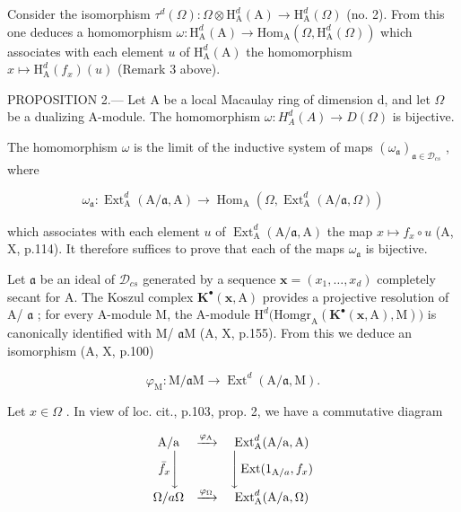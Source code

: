 Consider the isomorphism \(\tau^{d}(\Omega):\Omega\otimes\mathrm{H}_{\mathrm{A}}^{d}(\mathrm{A})\to\mathrm{H}_{\mathrm{A}}^{d}(\Omega)\) (no. 2). From this one deduces a homomorphism \(\omega:\mathrm{H}_{\mathrm{A}}^{d}(\mathrm{A})\to\mathrm{Hom}_{\mathrm{A}}(\Omega,\mathrm{H}_{\mathrm{A}}^{d}(\Omega))\) which associates with each element \(u\) of \(\mathrm{H}_{\mathrm{A}}^{d}(\mathrm{A})\) the homomorphism \(x\mapsto\mathrm{H}_{\mathrm{A}}^{d}(f_{x})(u)\) (Remark 3 above).

PROPOSITION 2.--- Let A be a local Macaulay ring of dimension d, and let \(\Omega\) be a dualizing A-module. The homomorphism \(\omega: H_{A}^{d}(A) \to D(\Omega)\) is bijective.

The homomorphism \(\omega\) is the limit of the inductive system of maps \((\omega_{\mathfrak{a}})_{\mathfrak{a}\in\mathcal{D}_{cs}}\) , where

\[
\omega_ {\mathfrak {a}}: \operatorname{Ext} _ {\mathrm{A}} ^ {d} (\mathrm{A} / \mathfrak {a}, \mathrm{A}) \longrightarrow \operatorname{Hom} _ {\mathrm{A}} (\Omega , \operatorname{Ext} _ {\mathrm{A}} ^ {d} (\mathrm{A} / \mathfrak {a}, \Omega))
\]

which associates with each element \(u\) of \(\operatorname{Ext}_{\mathrm{A}}^{d}(\mathrm{A}/\mathfrak{a},\mathrm{A})\) the map \(x\mapsto f_{x}\circ u\) (A, X, p.114). It therefore suffices to prove that each of the maps \(\omega_{\mathfrak{a}}\) is bijective.

Let \(\mathfrak{a}\) be an ideal of \(\mathcal{D}_{cs}\) generated by a sequence \(\mathbf{x} = (x_1, \ldots, x_d)\) completely secant for A. The Koszul complex \(\mathbf{K}^{\bullet}(\mathbf{x}, \mathrm{A})\) provides a projective resolution of A/ \(\mathfrak{a}\) ; for every A-module M, the A-module \(\mathrm{H}^d\big(\mathrm{Homgr}_\mathrm{A}(\mathbf{K}^{\bullet}(\mathbf{x}, \mathrm{A}), \mathrm{M})\big)\) is canonically identified with M/ \(\mathfrak{a}\mathrm{M}\) (A, X, p.155). From this we deduce an isomorphism (A, X, p.100)

\[
\varphi_ {\mathrm{M}}: \mathrm{M} / \mathfrak {a} \mathrm{M} \longrightarrow \operatorname{Ext} ^ {d} (\mathrm{A} / \mathfrak {a}, \mathrm{M}).
\]

Let \(x \in \Omega\) . In view of loc. cit., p.103, prop. 2, we have a commutative diagram

\[
\begin{array}{c c c} \mathrm{A/a} & \xrightarrow {\varphi_ {\mathrm{A}}} & \operatorname{Ext} _ {\mathrm{A}} ^ {d} (\mathrm{A/a}, \mathrm{A}) \\ \bar {f} _ {x} \Bigg \downarrow & & \Bigg \downarrow \operatorname{Ext} (1 _ {\mathrm{A} / a}, f _ {x}) \\ \Omega / a \Omega & \xrightarrow {\varphi_ {\Omega}} & \operatorname{Ext} _ {\mathrm{A}} ^ {d} (\mathrm{A/a}, \Omega) \end{array}
\]

